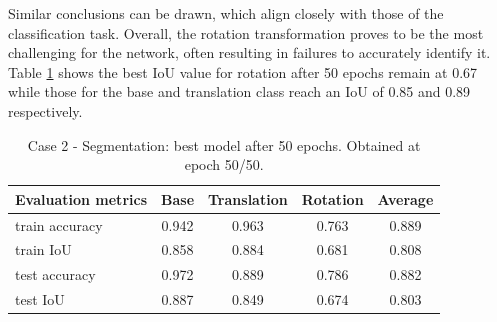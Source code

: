 Similar conclusions can be drawn, which align closely with those of the classification task. Overall, the rotation transformation proves to be the most challenging for the network, often resulting in failures to accurately identify it. Table \ref{tab:seg_noise} shows the best IoU value for rotation after 50 epochs remain at 0.67 while those for the base and translation class reach an IoU of 0.85 and 0.89 respectively.
\begin{table}[ht]
    \begin{center}
        \begin{tabular}{|l||c|c|c|c|}
            \hline
            Evaluation metrics & Base & Translation & Rotation & Average \\
            \hline \hline
            train accuracy & 0.942 & 0.963 & 0.763 & 0.889 \\
            \hline
            train IoU & 0.858 & 0.884 & 0.681 & 0.808 \\
            \hline
            test accuracy & 0.972 & 0.889 & 0.786 & 0.882 \\
            \hline
            test IoU & 0.887 & 0.849 & 0.674 & 0.803 \\
            \hline
        \end{tabular}
    \end{center}
    \caption{Case 2 - Segmentation: best model after 50 epochs. Obtained at epoch 50/50.}
    \label{tab:seg_noise}
\end{table}
